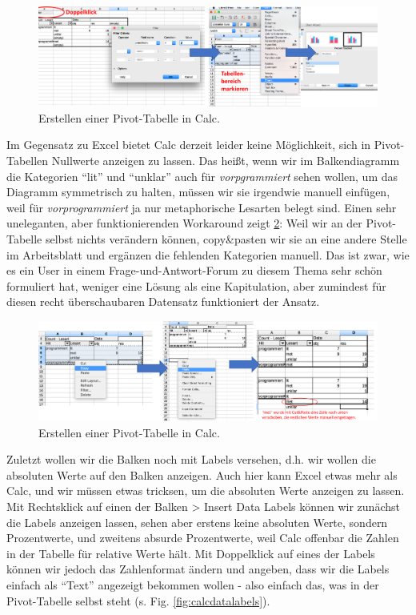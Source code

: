 \documentclass[]{article}
\begin{document}
\begin{figure}
\includegraphics[width=6.66in]{docs/fig/calc_chart} \caption{Erstellen einer Pivot-Tabelle in Calc.}\label{fig:calcchart}
\end{figure}

Im Gegensatz zu Excel bietet Calc derzeit leider keine Möglichkeit, sich
in Pivot-Tabellen Nullwerte anzeigen zu lassen. Das heißt, wenn wir im
Balkendiagramm die Kategorien ``lit'' und ``unklar'' auch für
\emph{vorpgrammiert} sehen wollen, um das Diagramm symmetrisch zu
halten, müssen wir sie irgendwie manuell einfügen, weil für
\emph{vorprogrammiert} ja nur metaphorische Lesarten belegt sind. Einen
sehr uneleganten, aber funktionierenden Workaround zeigt
\ref{fig:calcchart2}: Weil wir an der Pivot-Tabelle selbst nichts
verändern können, copy\&pasten wir sie an eine andere Stelle im
Arbeitsblatt und ergänzen die fehlenden Kategorien manuell. Das ist
zwar, wie es ein User in einem Frage-und-Antwort-Forum zu diesem Thema
sehr schön formuliert hat, weniger eine Lösung als eine Kapitulation,
aber zumindest für diesen recht überschaubaren Datensatz funktioniert
der Ansatz.

\begin{figure}
\includegraphics[width=6.66in]{docs/fig/calc_chart2} \caption{Erstellen einer Pivot-Tabelle in Calc.}\label{fig:calcchart2}
\end{figure}

Zuletzt wollen wir die Balken noch mit Labels versehen, d.h. wir wollen
die absoluten Werte auf den Balken anzeigen. Auch hier kann Excel etwas
mehr als Calc, und wir müssen etwas tricksen, um die absoluten Werte
anzeigen zu lassen. Mit Rechtsklick auf einen der Balken \textgreater{}
Insert Data Labels können wir zunächst die Labels anzeigen lassen, sehen
aber erstens keine absoluten Werte, sondern Prozentwerte, und zweitens
absurde Prozentwerte, weil Calc offenbar die Zahlen in der Tabelle für
relative Werte hält. Mit Doppelklick auf eines der Labels können wir
jedoch das Zahlenformat ändern und angeben, dass wir die Labels einfach
als ``Text'' angezeigt bekommen wollen - also einfach das, was in der
Pivot-Tabelle selbst steht (s. Fig. \ref{fig:calcdatalabels}).
\end{document}
